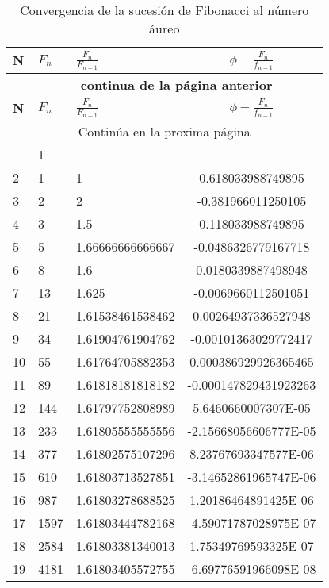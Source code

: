 \begin{longtable}{lllc}
	\caption{Convergencia de la sucesión de Fibonacci al número áureo }
	\label{tab:w1wwwww}\\
	\toprule
	\textbf{N} & \textbf{$F_n$} & \textbf{$\frac{F_n}{F_{n-1}}$}&\textbf{$\phi-\frac{F_n}{f_{n-1}}$}\\\midrule
	\endfirsthead %
 \multicolumn{4}{c}{{\bfseries \tablename\ \thetable{} -- continua de la página anterior}} \\
	\toprule
	\textbf{N} & \textbf{$F_n$} & \textbf{$\frac{F_n}{F_{n-1}}$}&\textbf{$\phi-\frac{F_n}{f_{n-1}}$}\\\midrule
	\endhead
	\midrule\multicolumn{4}{c}{{Continúa en la proxima página}} \\\midrule
	\endfoot
	\bottomrule
	\endlastfoot
1	&	1	&		&		\\
2	&	1	&	1	&	0.618033988749895	\\
3	&	2	&	2	&	-0.381966011250105	\\
4	&	3	&	1.5	&	0.118033988749895	\\
5	&	5	&	1.66666666666667	&	-0.0486326779167718	\\
6	&	8	&	1.6	&	0.0180339887498948	\\
7	&	13	&	1.625	&	-0.0069660112501051	\\
8	&	21	&	1.61538461538462	&	0.00264937336527948	\\
9	&	34	&	1.61904761904762	&	-0.00101363029772417	\\
10	&	55	&	1.61764705882353	&	0.000386929926365465	\\
11	&	89	&	1.61818181818182	&	-0.000147829431923263	\\
12	&	144	&	1.61797752808989	&	5.6460660007307E-05	\\
13	&	233	&	1.61805555555556	&	-2.15668056606777E-05	\\
14	&	377	&	1.61802575107296	&	8.23767693347577E-06	\\
15	&	610	&	1.61803713527851	&	-3.14652861965747E-06	\\
16	&	987	&	1.61803278688525	&	1.20186464891425E-06	\\
17	&	1597	&	1.61803444782168	&	-4.59071787028975E-07	\\
18	&	2584	&	1.61803381340013	&	1.75349769593325E-07	\\
19	&	4181	&	1.61803405572755	&	-6.69776591966098E-08	\\

\end{longtable}
